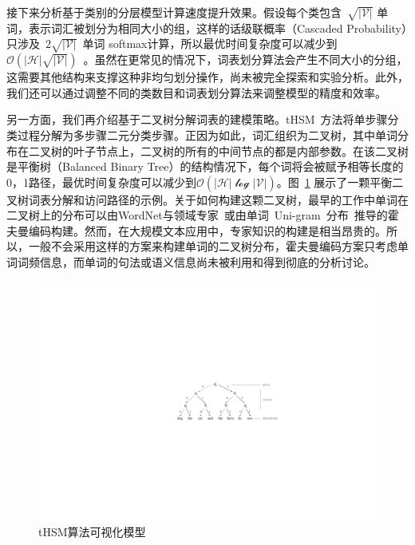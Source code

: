 接下来分析基于类别的分层模型计算速度提升效果。假设每个类包含~$\sqrt{\mathcal{|V|}}$ 单词，表示词汇被划分为相同大小的组，这样的话级联概率（Cascaded Probability）只涉及~$2\sqrt{\mathcal{|V|}}$~单词 softmax计算，所以最优时间复杂度可以减少到~$\mathcal{O}(\mathcal{|H|}\sqrt{\mathcal{|V|}})$~。虽然在更常见的情况下，词表划分算法会产生不同大小的分组，这需要其他结构来支撑这种非均匀划分操作，尚未被完全探索和实验分析。此外，我们还可以通过调整不同的类数目和词表划分算法来调整模型的精度和效率。

另一方面，我们再介绍基于二叉树分解词表的建模策略。tHSM~方法将单步骤分类过程分解为多步骤二元分类步骤。正因为如此，词汇组织为二叉树，其中单词分布在二叉树的叶子节点上，二叉树的所有的中间节点的都是内部参数。在该二叉树是平衡树（Balanced Binary Tree）的结构情况下，每个词将会被赋予相等长度的0，1路径，最优时间复杂度可以减少到$\mathcal{O(|H|\log \mathcal{|V|})}$。图~\ref{fig:case_thsm} 展示了一颗平衡二叉树词表分解和访问路径的示例。关于如何构建这颗二叉树，最早的工作中单词在二叉树上的分布可以由WordNet与领域专家~或由单词~Uni-gram~分布~推导的霍夫曼编码构建。然而，在大规模文本应用中，专家知识的构建是相当昂贵的。所以，一般不会采用这样的方案来构建单词的二叉树分布，霍夫曼编码方案只考虑单词词频信息，而单词的句法或语义信息尚未被利用和得到彻底的分析讨论。

\begin{figure}[!t]
  \centering
\includegraphics[width=.85\linewidth]{./figures/thsm-example.pdf}
\caption{tHSM算法可视化模型}\label{fig:case_thsm}
\end{figure}

